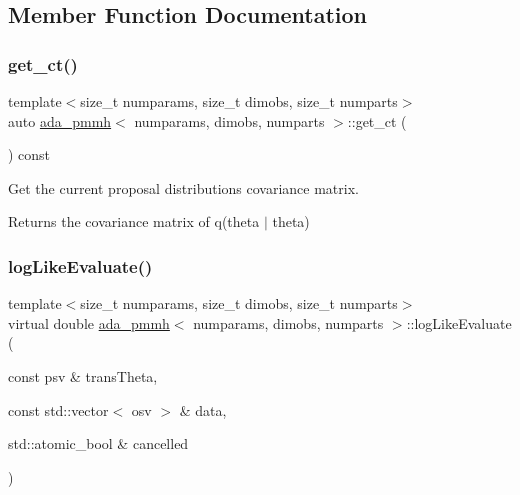 \subsection{Member Function Documentation}
\mbox{\label{classada__pmmh_ae8cbd73ca691b9ad464c00ff666a8b48}} 
\subsubsection{\texorpdfstring{get\+\_\+ct()}{get\_ct()}}
{\footnotesize\ttfamily template$<$size\+\_\+t numparams, size\+\_\+t dimobs, size\+\_\+t numparts$>$ \\
auto \hyperlink{classada__pmmh}{ada\+\_\+pmmh}$<$ numparams, dimobs, numparts $>$\+::get\+\_\+ct (\begin{DoxyParamCaption}{ }\end{DoxyParamCaption}) const}



Get the current proposal distribution\textquotesingle{}s covariance matrix. 

\begin{DoxyReturn}{Returns}
the covariance matrix of q(theta\textquotesingle{} $\vert$ theta) 
\end{DoxyReturn}
\mbox{\label{classada__pmmh_ae07210fc64b1966cef4d5a594be687f1}} 
\subsubsection{\texorpdfstring{log\+Like\+Evaluate()}{logLikeEvaluate()}}
{\footnotesize\ttfamily template$<$size\+\_\+t numparams, size\+\_\+t dimobs, size\+\_\+t numparts$>$ \\
virtual double \hyperlink{classada__pmmh}{ada\+\_\+pmmh}$<$ numparams, dimobs, numparts $>$\+::log\+Like\+Evaluate (\begin{DoxyParamCaption}\item[{const psv \&}]{trans\+Theta,  }\item[{const std\+::vector$<$ osv $>$ \&}]{data,  }\item[{std\+::atomic\+\_\+bool \&}]{cancelled }\end{DoxyParamCaption})\hspace{0.3cm}{\ttfamily [pure virtual]}}



